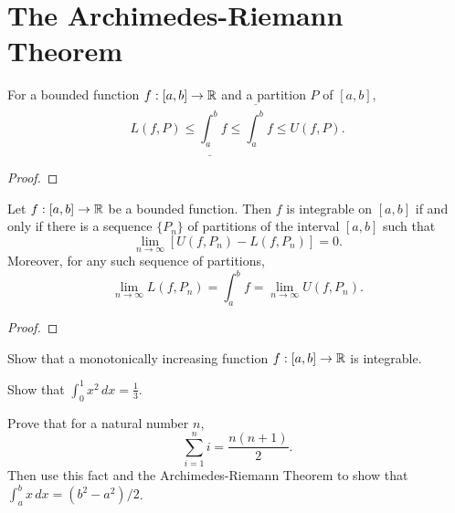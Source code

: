 \documentclass[letterpaper, twoside, 12pt]{book}
\begin{document}
\section{The Archimedes-Riemann Theorem}


\begin{lemma}[6.7]
  For a bounded function \(f:[a,b]\to\mathbb R\) and a partition \(P\) of
  \([a,b]\),
  \[
    L(f,P)
      \leq
    \underline{\int_a^b}f\leq\overline{\int_a^b}f\leq U(f,P)
  .\]
\end{lemma}
\begin{proof}

\end{proof}


\begin{theorem}
  Let \(f:[a,b]\to\mathbb R\) be a bounded function. Then \(f\) is integrable on
  \([a,b]\) if and only if there is a sequence \(\{P_n\}\) of partitions
  of the interval \([a,b]\) such that
  \[
    \lim_{n\to\infty}[U(f,P_n)-L(f,P_n)]=0
  .\]
  Moreover, for any such sequence of partitions,
  \[
    \lim_{n\to\infty} L(f,P_n)
      =
    \int_a^b f
      =
    \lim_{n\to\infty} U(f,P_n)
  .\]
\end{theorem}
\begin{proof}

\end{proof}


\begin{example}[6.9]
  Show that
  a monotonically increasing function \(f:[a,b]\to\mathbb R\) is integrable.
\end{example}
\begin{solution}

\end{solution}

\begin{example}[6.11]
  Show that \(\int_0^1 x^2\,dx=\frac{1}{3}\).
\end{example}
\begin{solution}

\end{solution}


\begin{exercise}[4]
  Prove that for a natural number \(n\),
  \[
    \sum_{i=1}^n i = \frac{n(n+1)}{2}
  .\]
  Then use this fact and the Archimedes-Riemann Theorem to show that
  \(\int_a^b x\,dx=(b^2-a^2)/2\).
\end{exercise}
\begin{solution}

\end{solution}
\end{document}
